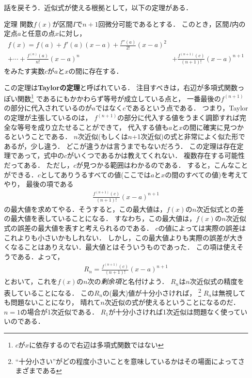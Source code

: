 話を戻そう．近似式が使える根拠として，以下の定理がある．
\begin{itembox}[l]{定理}
関数$f(x)$が区間$I$で$n+1$回微分可能であるとする．
このとき，区間$I$内の定点$a$と任意の点$x$に対し，
\begin{align*}
f(x) = f(a) +  f'(a) (x-a)  + \frac{f''(a)}{2!}(x-a)^2 & \\ 
+ \cdots 
+ \frac{f^{(n)}(a)}{n!}(x-a)^n & + \frac{f^{(n+1)}(c)}{(n+1)!}(x-a)^{n+1}
  \label{eq:taylorth}
\end{align*}
をみたす実数$c$が$a$と$x$の間に存在する．
\end{itembox}
この定理は\textbf{Taylorの定理}と呼ばれている．
注目すべきは，右辺が多項式関数っぽい関数\footnote{$c$が$x$に依存するので右辺は多項式関数ではない}
であるにもかかわらず等号が成立している点と，
一番最後の$f^{(n+1)}$の部分に代入されているのが$a$ではなく$c$であるという点である．
つまり，Taylorの定理が主張しているのは，
$f^{(n+1)}$の部分に代入する値をうまく調節すれば完全な等号を成り立たせることができて，
代入する値も$a$と$x$の間に確実に見つかるということである．
$n$次近似(もしくは$n$+1次近似)の式と非常によく似た形であるが，少し違う．
どこが違うかは言うまでもないだろう．
この定理は存在定理であって，式中の$c$がいくつであるかは教えてくれない．
複数存在する可能性だってある．
ただし，$c$が見つかる範囲はわかるのである．
すると，こんなことができる．$c$としてありうるすべての値(ここでは$a$と$x$の間のすべての値)を考えてやり，
最後の項である
\begin{align*}
\frac{f^{(n+1)}(c)}{(n+1)!}(x-a)^{n+1}
\end{align*}
の最大値を求めてやる．そうすると，この最大値は，$f(x)$の$n$次近似式との差の最大値を表していることになる．
すなわち，この最大値は，{$f(x)$}の{$n$}次近似式の誤差の最大値を表すと考えられるのである．
$c$の値によっては実際の誤差はこれよりも小さいかもしれない．
しかし，この最大値よりも実際の誤差が大きくなることはありえない．最大値とはそういうものであった．
この項は使えそうである．よって，
\begin{align}
R_n = \frac{f^{(n+1)}(c)}{(n+1)!}(x-a)^{n+1}
\end{align}
とおいて，これを$f(x)$の$n$次の\emph{剰余項}と名付けよう．
$R_n$は$n$次近似式の精度を表していることになる．
この$R_n$の(最大)値が十分小さければ，
\footnote{``十分小さい''がどの程度小さいことを意味しているかはその場面によってさまざまである}
$R_n$は無視しても問題ないことになり，
晴れて$n$次近似の式が使えるということになるのだ．
$n=1$の場合が1次近似である．
$R_1$が十分小さければ1次近似は問題なく使っていいのである．
